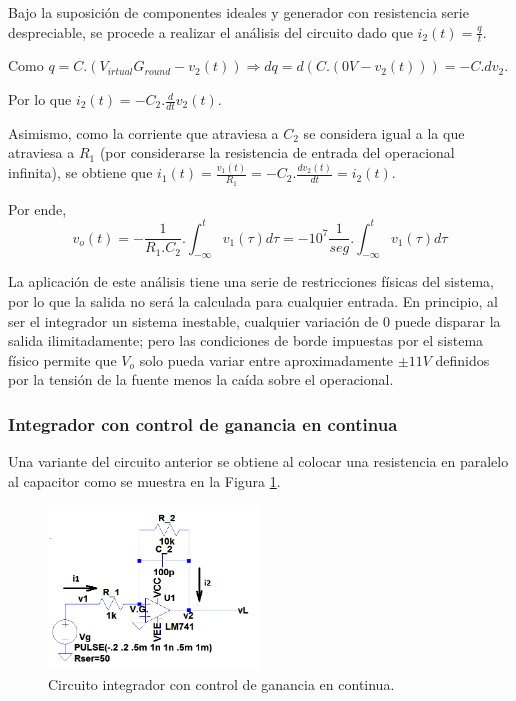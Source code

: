 Bajo la suposición de componentes ideales y generador con resistencia serie despreciable, se procede a realizar el análisis del circuito dado que $i_2(t) = \frac{q}{t}$.

Como $q = C.(V_{irtual}G_{round}-v_2(t)) \Rightarrow dq = d(C.(0V-v_2(t))) = -C.dv_2$.

Por lo que $i_2(t) = -C_2. \frac{d}{dt}v_2(t)$.

Asimismo, como la corriente que atraviesa a $C_2$ se considera igual a la que atraviesa a $R_1$ (por considerarse la resistencia de entrada del operacional infinita), se obtiene que $i_1(t) = \frac{v_1(t)}{R_1} = -C_2. \frac{dv_2(t)}{dt} = i_2(t)$.

Por ende,
\begin{equation}
v_o(t) = - \frac{1}{R_1.C_2}.\int_{-\infty}^{t}v_1(\tau)d\tau = -10^7\frac{1}{seg}.\int_{-\infty}^{t}v_1(\tau)d\tau
\end{equation}

La aplicación de este análisis tiene una serie de restricciones físicas del sistema, por lo que la salida no será la calculada para cualquier entrada. En principio, al ser el integrador un sistema inestable, cualquier variación de 0 puede disparar la salida ilimitadamente; pero las condiciones de borde impuestas por el sistema físico permite que $V_o$ solo pueda variar entre aproximadamente $\pm 11V$  definidos por la tensión de la fuente menos la caída sobre el operacional.



\subsubsection{Integrador con control de ganancia en continua}

Una variante del circuito anterior se obtiene al colocar una resistencia en paralelo al capacitor como se muestra en la Figura \ref{circ:int2}.

\begin{figure}[H]
  \centering
      \includegraphics[width=0.5\textwidth]{gfx_22/circ_int2}
  \caption{Circuito integrador con control de ganancia en continua.}
  \label{circ:int2}
\end{figure}

